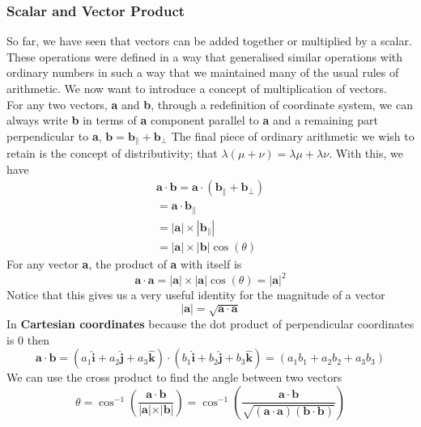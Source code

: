 \documentclass[11pt,titlepage]{article}
\numberwithin{equation}{subsection}
\begin{document}
\subsubsection{Scalar and Vector Product}
So far, we have seen that vectors can be added together or multiplied by a scalar. These operations were defined in a way that generalised similar operations with ordinary numbers in such a way that we maintained many of the usual rules of arithmetic. We now want to introduce a concept of multiplication of vectors.
\\
For any two vectors, \textbf{a} and \textbf{b}, through a redefinition of coordinate system,
we can always write \textbf{b} in terms of \textbf{a} component parallel to \textbf{a} and a remaining part perpendicular to \textbf{a}, $\mathbf{b}=\mathbf{b}_{\parallel}+\mathbf{b}_{\perp}$
The final piece of ordinary arithmetic we wish to retain is the concept of
distributivity; that $\lambda(\mu + \nu) = \lambda\mu + \lambda\nu$. With this, we have
\begin{equation}
    \begin{split}
        \mathbf{a}\cdot\mathbf{b}=\mathbf{a}\cdot(\mathbf{b}_{\parallel}+\mathbf{b}_{\perp}) \\
        =\mathbf{a}\cdot\mathbf{b}_{\parallel}\\
        =|\mathbf{a}|\times|\mathbf{b}_{\parallel}|\\
        =|\mathbf{a}|\times|\mathbf{b}|\cos(\theta)  
    \end{split}
\end{equation}
For any vector \textbf{a}, the product of \textbf{a} with itself is
\begin{equation}
    \mathbf{a}\cdot\mathbf{a}=|\mathbf{a}|\times|\mathbf{a}|\cos(\theta)=|\mathbf{a}|^2
\end{equation}
Notice that this gives us a very useful identity for the magnitude of a vector
\begin{equation}
    |\mathbf{a}|=\sqrt{\mathbf{a}\cdot\mathbf{a}}
\end{equation}
In \textbf{Cartesian coordinates} because the dot product of perpendicular coordinates is 0 then
\begin{equation}
    \mathbf{a}\cdot\mathbf{b}=(a_1\mathbf{\hat{i}}+a_2\mathbf{\hat{j}}+a_3\mathbf{\hat{k}})\cdot(b_1\mathbf{\hat{i}}+b_2\mathbf{\hat{j}}+b_3\mathbf{\hat{k}})=(a_1b_1+a_2b_2+a_3b_3)
\end{equation}
We can use the cross product to find the angle between two vectors
\begin{equation}
    \theta=\cos^{-1}\left(\frac{\mathbf{a}\cdot\mathbf{b}}{|\mathbf{a|\times|\mathbf{b}|}}\right)=\cos^{-1}\left(\frac{\mathbf{a}\cdot\mathbf{b}}{\sqrt{(\mathbf{a}\cdot\mathbf{a})(\mathbf{b\cdot\mathbf{b}})}}\right)
\end{equation}
\end{document}
